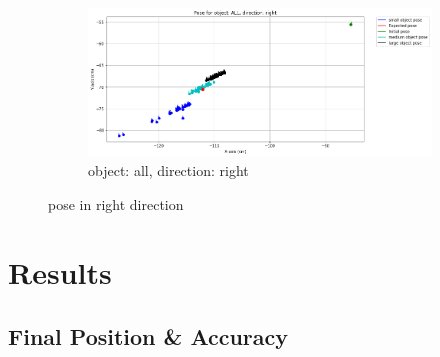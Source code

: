 \documentclass[10pt,a4paper]{article}
\begin{document}
								\begin{figure}[H]
%									
									\begin{subfigure}{\textwidth}
										\centering
										\includegraphics[width=0.8\linewidth]{img/pose_all_right.png}
										\caption{object: all, direction: right}
										\label{fig:object: all, direction: right}
									\end{subfigure}
									
									\caption{pose in right direction}
									\label{fig:pose in right direction}
								\end{figure}

					
				\section{Results}
					\subsection{Final Position \& Accuracy }
\end{document}
